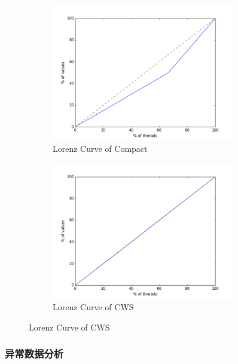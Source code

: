 \begin{figure}[!htp]
  \centering
  \begin{subfigure}{8.0cm}
    \centering
    \includegraphics[height=6.0cm]{figure/compact-high-12.png}
    \caption{Lorenz Curve of Compact}
  \end{subfigure}
  \hspace{2em}
  \begin{subfigure}{6.0cm}
    \centering
    \includegraphics[height=6.0cm]{figure/CWS-high-12.png}
    \caption{Lorenz Curve of CWS}
  \end{subfigure}
  \label{fig:high-12}
\end{figure}



\subsubsection{异常数据分析}

